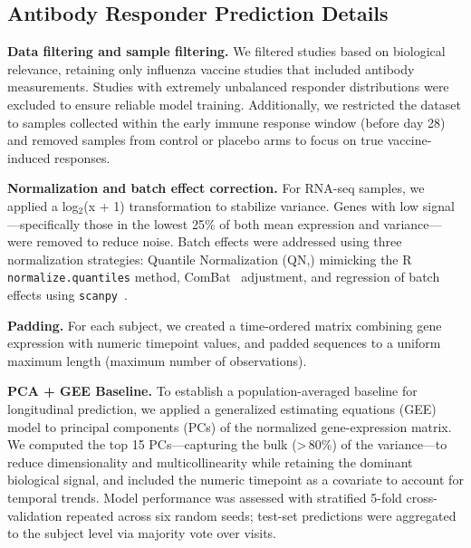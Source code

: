\documentclass[
  12pt]{article}
\begin{document}
\subsection{Antibody Responder Prediction Details}
\textbf{Data filtering and sample filtering.} We filtered studies based on biological relevance, retaining only influenza vaccine studies that included antibody measurements. Studies with extremely unbalanced responder distributions were excluded to ensure reliable model training. Additionally, we restricted the dataset to samples collected within the early immune response window (before day 28) and removed samples from control or placebo arms to focus on true vaccine-induced responses.

\textbf{Normalization and batch effect correction.} For RNA-seq samples, we applied a log$_2$(x + 1) transformation to stabilize variance. Genes with low signal—specifically those in the lowest 25\% of both mean expression and variance—were removed to reduce noise. Batch effects were addressed using three normalization strategies: Quantile Normalization (QN,\citealp{bolstad2003comparison}) mimicking the R \texttt{normalize.quantiles} method, ComBat~\citep{johnson2007adjusting} adjustment, and regression of batch effects using \texttt{scanpy}~\citep{wolf2018scanpy}.

\textbf{Padding.} For each subject, we created a time-ordered matrix combining gene expression with numeric timepoint values, and padded sequences to a uniform maximum length (maximum number of observations).

\textbf{PCA + GEE Baseline.}
To establish a population-averaged baseline for longitudinal prediction, we applied a generalized estimating equations (GEE) model to principal components (PCs) of the normalized gene-expression matrix. We computed the top 15 PCs—capturing the bulk (>\,80\%) of the variance—to reduce dimensionality and multicollinearity while retaining the dominant biological signal, and included the numeric timepoint as a covariate to account for temporal trends. Model performance was assessed with stratified 5-fold cross-validation repeated across six random seeds; test-set predictions were aggregated to the subject level via majority vote over visits. 
\end{document}
